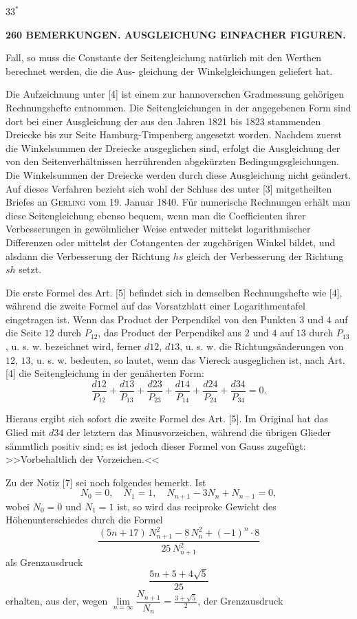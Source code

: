 \documentclass[12pt,a4paper]{article}
\theoremstyle{plain}
\theoremstyle{definition}
\theoremstyle{remark}
\begin{document}
\hfill $33^*$


\newpage

\noindent\textbf{260 BEMERKUNGEN. AUSGLEICHUNG EINFACHER FIGUREN.}

Fall, so muss die Constante der Seitengleichung nat\"urlich mit den Werthen berechnet werden, die die Aus-
gleichung der Winkelgleichungen geliefert hat.

Die Aufzeichnung unter [4] ist einem zur hannoverschen Gradmessung geh\"origen Rechnungshefte
entnommen. Die Seitengleichungen in der angegebenen Form sind dort bei einer Ausgleichung der aus
den Jahren 1821 bis 1823 stammenden Dreiecke bis zur Seite Hamburg-Timpenberg angesetzt worden.
Nachdem zuerst die Winkelsummen der Dreiecke ausgeglichen sind, erfolgt die Ausgleichung der von den
Seitenverh\"altnissen herr\"uhrenden abgek\"urzten Bedingungsgleichungen. Die Winkelsummen der Dreiecke
werden durch diese Ausgleichung nicht ge\"andert. Auf dieses Verfahren bezieht sich wohl der Schluss des
unter [3] mitgetheilten Briefes an \textsc{Gerling} vom 19. Januar 1840. F\"ur numerische Rechnungen erh\"alt man
diese Seitengleichung ebenso bequem, wenn man die Coefficienten ihrer Verbesserungen in gew\"ohnlicher
Weise entweder mittelst logarithmischer Differenzen oder mittelst der Cotangenten der zugeh\"origen Winkel
bildet, und alsdann die Verbesserung der Richtung $hs$ gleich der Verbesserung der Richtung $sh$ setzt.

Die erste Formel des Art. [5] befindet sich in demselben Rechnungshefte wie [4], w\"ahrend die zweite
Formel auf das Vorsatzblatt einer Logarithmentafel eingetragen ist. Wenn das Product der Perpendikel
von den Punkten $3$ und $4$ auf die Seite $12$ durch $P_{12}$, das Product der Perpendikel aus $2$ und $4$ auf $13$
durch $P_{13}$, u. s. w. bezeichnet wird, ferner $d12$, $d13$, u. s. w. die Richtungs\"anderungen von $12$, $13$, u. s. w.
bedeuten, so lautet, wenn das Viereck ausgeglichen ist, nach Art. [4] die Seitengleichung in der gen\"aherten
Form:
\[
\frac{d12}{P_{12}} + \frac{d13}{P_{13}} + \frac{d23}{P_{23}} + \frac{d14}{P_{14}} + \frac{d24}{P_{24}} + \frac{d34}{P_{34}} = 0.
\]

Hieraus ergibt sich sofort die zweite Formel des Art. [5]. Im Original hat das Glied mit $d34$ der
letztern das Minusvorzeichen, w\"ahrend die \"ubrigen Glieder s\"ammtlich positiv sind; es ist jedoch dieser
Formel von Gauss zugef\"ugt: >>Vorbehaltlich der Vorzeichen.<<

Zu der Notiz [7] sei noch folgendes bemerkt. Ist
\[
N_0 = 0,\quad N_1 = 1,\quad N_{n+1} - 3N_n + N_{n-1} = 0,
\]
wobei $N_0 = 0$ und $N_1 = 1$ ist, so wird das reciproke Gewicht des H\"ohenunterschiedes durch die Formel
\[
\frac{(5n + 17)\,N_{n+1}^2 - 8\,N_n^2 + (-1)^n \cdot 8}{25\,N_{n+1}^2}
\]
als Grenzausdruck
\[
\frac{5n + 5 + 4\sqrt{5}}{25}
\]
erhalten, aus der, wegen $\lim\limits_{n=\infty}\dfrac{N_{n+1}}{N_n} = \frac{3 + \sqrt{5}}{2}$, der Grenzausdruck
\end{document}
